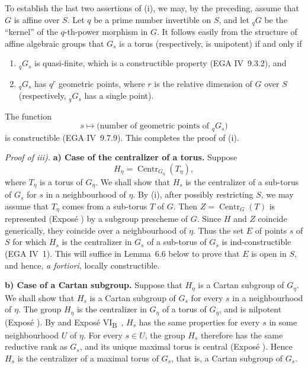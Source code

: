 To establish the last two assertions of (i), we may, by the
preceding, assume that \(G\) is affine over \(S\). Let \(q\) be a
prime number invertible on \(S\), and let \({}_qG\) be the
``kernel'' of the \(q\)-th-power morphism in \(G\). It follows
easily from the structure of affine algebraic groups that \(G_s\)
is a torus (respectively, is unipotent) if and only if
\begin{enumerate}
\renewcommand{\labelenumi}{\textup{\alph{enumi})}}
\item \({}_qG_s\) is quasi-finite, which is a constructible
property (EGA IV~9.3.2), and
\item \({}_qG_s\) has \(q^r\) geometric points, where \(r\) is the
relative dimension of \(G\) over \(S\) (respectively,
\({}_qG_s\) has a single point).
\end{enumerate}
The function
\[
 s\longmapsto
 \bigl(\text{number of geometric points of }{}_qG_s\bigr)
\]
is constructible (EGA IV~9.7.9). This completes the proof of (i).

\emph{Proof of iii).} \textbf{a) Case of the centralizer of a
torus.} Suppose
\[
  H_{\eta}=\operatorname{Centr}_{G_{\eta}}(T_{\eta}),
\]
where \(T_{\eta}\) is a torus of \(G_{\eta}\). We shall show that
\(H_s\) is the centralizer of a sub-torus of \(G_s\) for \(s\) in a
neighbourhood of \(\eta\). By (i), after possibly restricting \(S\),
we may assume that \(T_{\eta}\) comes from a sub-torus \(T\) of
\(G\). Then \(Z=\operatorname{Centr}_{G}(T)\) is represented
(Exposé ) by a subgroup prescheme of \(G\). Since \(H\) and
\(Z\) coincide generically, they coincide over a neighbourhood of
\(\eta\). Thus the set \(E\) of points \(s\) of \(S\) for which
\(H_s\) is the centralizer in \(G_s\) of a sub-torus of \(G_s\) is
ind-constructible (EGA IV~1). This will suffice in Lemma~6.6 below
to prove that \(E\) is open in \(S\), and hence, \emph{a fortiori},
locally constructible.

\textbf{b) Case of a Cartan subgroup.} Suppose that \(H_{\eta}\) is
a Cartan subgroup of \(G_{\eta}\). We shall show that \(H_s\) is a
Cartan subgroup of \(G_s\) for every \(s\) in a neighbourhood of
\(\eta\). The group \(H_{\eta}\) is the centralizer in \(G_{\eta}\)
of a torus of \(G_{\eta}\), and is nilpotent (Exposé ). By
 and Exposé VI\textsubscript{B}~, \(H_s\) has the same
properties for every \(s\) in some neighbourhood \(U\) of \(\eta\).
For every \(s\in U\), the group \(H_s\) therefore has the same
reductive rank as \(G_s\), and its unique maximal torus is central
(Exposé ). Hence \(H_s\) is the centralizer of a maximal torus
of \(G_s\), that is, a Cartan subgroup of \(G_s\).

